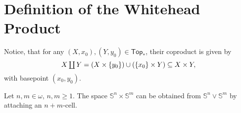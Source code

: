 \section{Definition of the Whitehead Product}
Notice, that for any $(X,x_0),(Y,y_0) \in \mathsf{Top}_*$, their coproduct is given by
\begin{equation*}
	\textstyle X \coprod Y = (X \times \cbr[0]{y_0}) \cup (\cbr[0]{x_0} \times Y) \subseteq X \times Y,
\end{equation*}
\noindent with basepoint $(x_0,y_0)$. 

\begin{lemma}
	\label{lem:attaching_cell_wedge_sum_spheres}
	Let $n,m \in \omega$, $n,m \geq 1$. The space $\mathbb{S}^n \times \mathbb{S}^m$ can be obtained from $\mathbb{S}^n \vee \mathbb{S}^m$ by attaching an $n + m$-cell.
\end{lemma}

